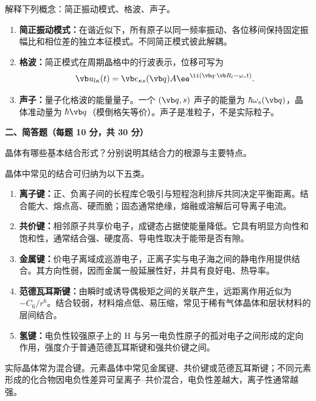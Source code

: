 \begin{question}[5 分]
解释下列概念：简正振动模式、格波、声子。


\begin{solution}
\begin{enumerate}
  \item \textbf{简正振动模式：}在谐近似下，所有原子以同一频率振动、各位移间保持固定振幅比和相位差的独立本征模式。不同简正模式彼此解耦。
  \item \textbf{格波：}简正模式在周期晶格中的行波表示，位移可写为
  \[
    \vb u_{l\kappa}(t)=\vb e_{\kappa s}(\vb q)A
    \ee^{\ii(\vb q\cdot\vb R_l-\omega_s t)}.
  \]
  \item \textbf{声子：}量子化格波的能量量子。一个 $(\vb q,s)$ 声子的能量为 $\hbar\omega_s(\vb q)$，晶体准动量为 $\hbar\vb q$（模倒格矢等价）。声子是准粒子，不是实际粒子。
\end{enumerate}
\end{solution}
\end{question}

\textbf{二、简答题（每题 10 分，共 30 分）}

\begin{question}[10 分]
晶体有哪些基本结合形式？分别说明其结合力的根源与主要特点。


\begin{solution}
晶体中常见的结合可归纳为以下五类。
\begin{enumerate}
  \item \textbf{离子键：}正、负离子间的长程库仑吸引与短程泡利排斥共同决定平衡距离。结合能大、熔点高、硬而脆；固态通常绝缘，熔融或溶解后可导离子电流。
  \item \textbf{共价键：}相邻原子共享价电子，成键态占据使能量降低。它具有明显方向性和饱和性，通常结合强、硬度高、导电性取决于能带是否有隙。
  \item \textbf{金属键：}价电子离域成巡游电子，正离子实与电子海之间的静电作用提供结合。其方向性弱，因而金属一般延展性好，并具有良好电、热导率。
  \item \textbf{范德瓦耳斯键：}由瞬时或诱导偶极矩之间的关联产生，远距离作用近似为 $-C_6/r^6$。结合较弱，材料熔点低、易压缩，常见于稀有气体晶体和层状材料的层间结合。
  \item \textbf{氢键：}电负性较强原子上的 H 与另一电负性原子的孤对电子之间形成的定向作用，强度介于普通范德瓦耳斯键和强共价键之间。
\end{enumerate}
实际晶体常为混合键。元素晶体中常见金属键、共价键或范德瓦耳斯键；不同元素形成的化合物因电负性差异可呈离子--共价混合，电负性差越大，离子性通常越强。
\end{solution}
\end{question}

